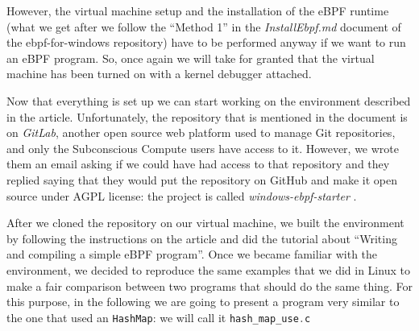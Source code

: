 However, the virtual machine setup and the installation of the eBPF runtime (what we get after we follow the ``Method 1'' in the \textit{InstallEbpf.md} document of the ebpf-for-windows repository) have to be performed anyway if we want to run an eBPF program.
So, once again we will take for granted that the virtual machine has been turned on with a kernel debugger attached.

Now that everything is set up we can start working on the environment described in the article.
Unfortunately, the repository that is mentioned in the document is on \textit{GitLab}, another open source web platform used to manage Git repositories, and only the Subconscious Compute users have access to it.
However, we wrote them an email asking if we could have had access to that repository and they replied saying that they would put the repository on GitHub and make it open source under AGPL license: the project is called \textit{windows-ebpf-starter} \cite{WineBPFStarterRepo}.

After we cloned the repository on our virtual machine, we built the environment by following the instructions on the article and did the tutorial about ``Writing and compiling a simple eBPF program''.
Once we became familiar with the environment, we decided to reproduce the same examples that we did in Linux to make a fair comparison between two programs that should do the same thing.
For this purpose, in the following we are going to present a program very similar to the one that used an \colorbox{backcolour}{\lstinline[style=cstyle, language=C]|HashMap|}: we will call it \colorbox{backcolour}{\lstinline[style=cstyle, language=C]|hash_map_use.c|}

